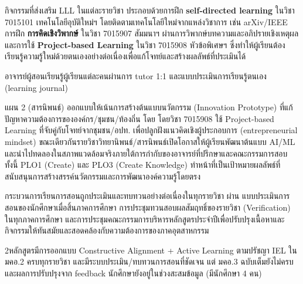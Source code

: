 กิจกรรมที่ส่งเสริม LLL ในแต่ละรายวิชา
ประกอบด้วยการฝึก \textbf{self-directed learning} ในวิชา 7015101 เทคโนโลยีอุบัติใหม่ฯ โดยติดตามเทคโนโลยีใหม่จากแหล่งวิชาการ เช่น arXiv/IEEE การฝึก \textbf{การคิดเชิงวิพากษ์} ในวิชา 7015907 สัมมนาฯ ผ่านการวิพากษ์บทความและอภิปรายเชิงเหตุผล และการใช้ \textbf{Project-based Learning} ในวิชา 7015908 หัวข้อพิเศษฯ ซึ่งทำให้ผู้เรียนต้องเรียนรู้ความรู้ใหม่ด้วยตนเองอย่างต่อเนื่องเพื่อแก้โจทย์และสร้างผลลัพธ์ที่ประเมินได้

อาจารย์ผู้สอนเรียนรู้ผู้เรียนแต่ละคนผ่านการ tutor 1:1 และแบบประเมินการเรียนรู้ตนเอง (learning journal)


แผน 2 (สารนิพนธ์) ออกแบบให้เน้นการสร้างต้นแบบนวัตกรรม (Innovation Prototype) ที่แก้ปัญหาความต้องการขององค์กร/ชุมชน/ท้องถิ่น โดย
โดยวิชา 7015908 ใช้ Project-based Learning ที่จับคู่กับโจทย์จากชุมชน/อปท. เพื่อปลูกฝังแนวคิดเชิงผู้ประกอบการ (entrepreneurial mindset) ขณะเดียวกันรายวิชาวิทยานิพนธ์/สารนิพนธ์เปิดโอกาสให้ผู้เรียนพัฒนาต้นแบบ AI/ML และนำไปทดลองในสภาพแวดล้อมจริงภายใต้การกำกับของอาจารย์ที่ปรึกษาและคณะกรรมการสอบ ทั้งนี้ PLO1 (Create) และ PLO3 (Create Knowledge) ทำหน้าที่เป็นเป้าหมายผลลัพธ์ที่สนับสนุนการสร้างสรรค์นวัตกรรมและการพัฒนาองค์ความรู้โดยตรง


กระบวนการเรียนการสอนถูกประเมินและทบทวนอย่างต่อเนื่องในทุกรายวิชา ผ่าน
แบบประเมินการสอนของนักศึกษาเมื่อสิ้นภาคการศึกษา การประชุมทวนสอบผลสัมฤทธิ์ของรายวิชา (Verification) ในทุกภาคการศึกษา และการประชุมคณะกรรมการบริหารหลักสูตรประจำปีเพื่อปรับปรุงเนื้อหาและกิจกรรมให้ทันสมัยและสอดคล้องกับความต้องการของภาคอุตสาหกรรม


\begin{selfassessmentbox}{2}{หลักสูตรมีการออกแบบ Constructive Alignment + Active Learning ตามปรัชญา IEL ใน มคอ.2 ครบทุกรายวิชา และมีระบบประเมิน/ทบทวนการสอนที่ชัดเจน แต่ มคอ.3 ฉบับเต็มยังไม่ครบ และผลการปรับปรุงจาก feedback นักศึกษายังอยู่ในช่วงสะสมข้อมูล (มีนักศึกษา 4 คน)}
\end{selfassessmentbox}

